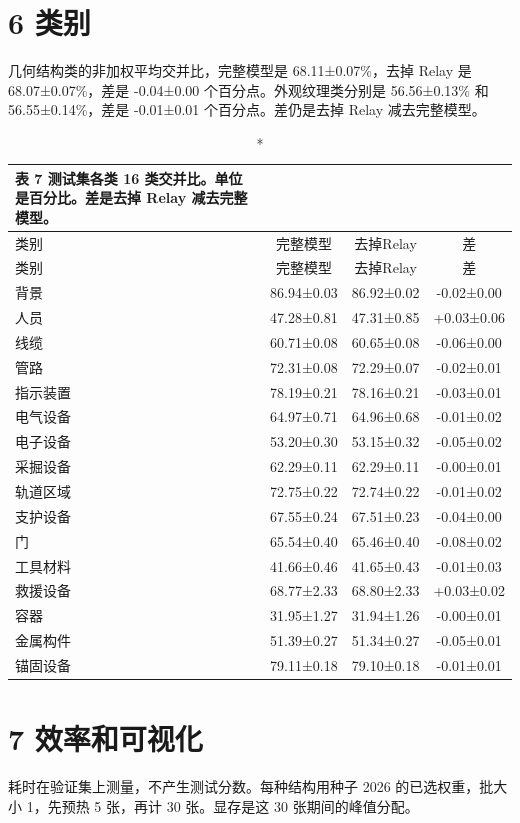 \documentclass[11pt]{article}
\begin{document}
\section*{6  类别}
几何结构类的非加权平均交并比，完整模型是 68.11±0.07\%，去掉 Relay 是 68.07±0.07\%，差是 -0.04±0.00 个百分点。外观纹理类分别是 56.56±0.13\% 和 56.55±0.14\%，差是 -0.01±0.01 个百分点。差仍是去掉 Relay 减去完整模型。

{\footnotesize\setlength{\tabcolsep}{3pt}
\begin{longtable}{lccc}
\caption*{表 7  测试集各类 16 类交并比。单位是百分比。差是去掉 Relay 减去完整模型。}\\
\toprule
类别 & 完整模型 & 去掉Relay & 差\\
\midrule
\endfirsthead
\toprule
类别 & 完整模型 & 去掉Relay & 差\\
\midrule
\endhead
背景 & 86.94±0.03 & 86.92±0.02 & -0.02±0.00\\
人员 & 47.28±0.81 & 47.31±0.85 & +0.03±0.06\\
线缆 & 60.71±0.08 & 60.65±0.08 & -0.06±0.00\\
管路 & 72.31±0.08 & 72.29±0.07 & -0.02±0.01\\
指示装置 & 78.19±0.21 & 78.16±0.21 & -0.03±0.01\\
电气设备 & 64.97±0.71 & 64.96±0.68 & -0.01±0.02\\
电子设备 & 53.20±0.30 & 53.15±0.32 & -0.05±0.02\\
采掘设备 & 62.29±0.11 & 62.29±0.11 & -0.00±0.01\\
轨道区域 & 72.75±0.22 & 72.74±0.22 & -0.01±0.02\\
支护设备 & 67.55±0.24 & 67.51±0.23 & -0.04±0.00\\
门 & 65.54±0.40 & 65.46±0.40 & -0.08±0.02\\
工具材料 & 41.66±0.46 & 41.65±0.43 & -0.01±0.03\\
救援设备 & 68.77±2.33 & 68.80±2.33 & +0.03±0.02\\
容器 & 31.95±1.27 & 31.94±1.26 & -0.00±0.01\\
金属构件 & 51.39±0.27 & 51.34±0.27 & -0.05±0.01\\
锚固设备 & 79.11±0.18 & 79.10±0.18 & -0.01±0.01\\
\bottomrule
\end{longtable}}
\section*{7  效率和可视化}
耗时在验证集上测量，不产生测试分数。每种结构用种子 2026 的已选权重，批大小 1，先预热 5 张，再计 30 张。显存是这 30 张期间的峰值分配。
\end{document}
